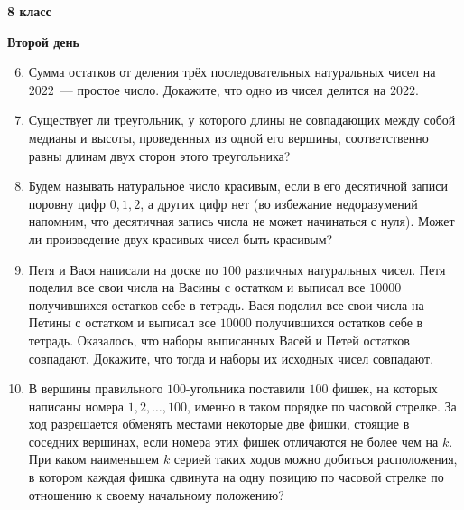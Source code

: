 \documentclass{article}
\begin{document}
    \begin{center}
        \LARGE\textbf{8 класс}
    \end{center}
    \begin{center}
        \large\textbf{Второй день}
    \end{center}


    \begin{enumerate}[label*=8.{\arabic{enumi}}]
        \setcounter{enumi}{5}
        \item Сумма остатков от деления трёх последовательных натуральных чисел на $2022$~--- простое число.
        Докажите, что одно из чисел делится на $2022$.

        \item Существует ли треугольник, у которого длины не совпадающих между собой медианы и высоты, проведенных из одной его вершины, соответственно равны длинам двух сторон этого треугольника?

        \item Будем называть натуральное число красивым, если в его десятичной записи поровну цифр $0, 1, 2$, а других цифр нет (во избежание недоразумений напомним, что десятичная запись числа не может начинаться с нуля).
        Может ли произведение двух красивых чисел быть красивым?

        \item Петя и Вася написали на доске по $100$ различных натуральных чисел.
        Петя поделил все свои числа на Васины с остатком и выписал все $10000$ получившихся остатков себе в тетрадь.
        Вася поделил все свои числа на Петины с остатком и выписал все $10000$ получившихся остатков себе в тетрадь.
        Оказалось, что наборы выписанных Васей и Петей остатков совпадают.
        Докажите, что тогда и наборы их исходных чисел совпадают.

        \item В вершины правильного $100$-угольника поставили $100$ фишек, на которых написаны номера $1, 2, \dotsc, 100$, именно в таком порядке по часовой стрелке.
        За ход разрешается обменять местами некоторые две фишки, стоящие в соседних вершинах, если номера этих фишек отличаются не более чем на $k$.
        При каком наименьшем $k$ серией таких ходов можно добиться расположения, в котором каждая фишка сдвинута на одну позицию по часовой стрелке по отношению к своему начальному положению?

    \end{enumerate}
\end{document}
